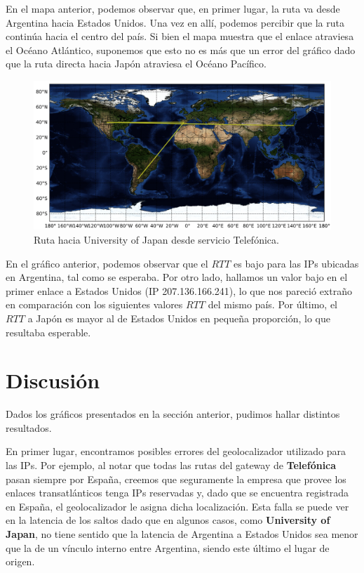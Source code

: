 \documentclass[10pt, a4paper]{article}
\begin{document}
En el mapa anterior, podemos observar que, en primer lugar, la ruta va desde Argentina hacia Estados Unidos. Una vez en allí, podemos percibir que la ruta continúa hacia el centro del país. Si bien el mapa muestra que el enlace atraviesa el Océano Atlántico, suponemos que esto no es más que un error del gráfico dado que la ruta directa hacia Japón atraviesa el Océano Pacífico.

\begin{figure}[H] %
\begin{center}
\includegraphics[width=400pt]{../imgs/map-iuj(telef).png}
\caption{Ruta hacia University of Japan desde servicio Telefónica.}
\end{center}
\end{figure}



En el gráfico anterior, podemos observar que el $RTT$ es bajo para las IPs ubicadas en Argentina, tal como se esperaba. Por otro lado, hallamos un valor bajo en el primer enlace a Estados Unidos (IP 207.136.166.241), lo que nos pareció extraño en comparación con los siguientes valores $RTT$ del mismo país. Por último, el $RTT$ a Japón es mayor al de Estados Unidos en pequeña proporción, lo que resultaba esperable.


\newpage
\section{Discusión}
Dados los gráficos presentados en la sección anterior, pudimos hallar distintos resultados. 

En primer lugar, encontramos posibles errores del geolocalizador utilizado para las IPs. Por ejemplo, al notar que todas las rutas del gateway de \textbf{Telefónica} pasan siempre por España, creemos que seguramente la empresa que provee los enlaces transatlánticos tenga IPs reservadas y, dado que se encuentra registrada en España, el geolocalizador le asigna dicha localización. Esta falla se puede ver en la latencia de los saltos dado que en algunos casos, como \textbf{University of Japan}, no tiene sentido que la latencia de Argentina a Estados Unidos sea menor que la de un vínculo interno entre Argentina, siendo este último el lugar de origen.
\end{document}
